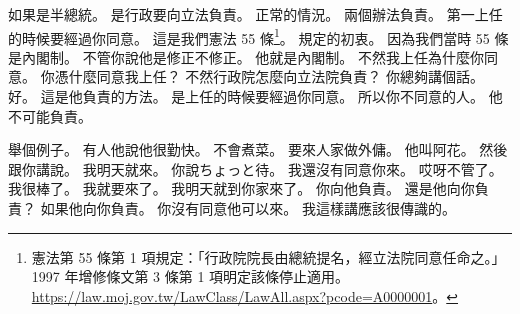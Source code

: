 \hypertarget{w01:cue:2482}{}如果是半總統。
\hypertarget{w01:cue:2483}{}是行政要向立法負責。
\hypertarget{w01:cue:2484}{}正常的情況。
\hypertarget{w01:cue:2485}{}兩個辦法負責。
\hypertarget{w01:cue:2486}{}第一上任的時候要經過你同意。
\hypertarget{w01:cue:2487}{}這是我們憲法 55 條\footnote{憲法第 55 條第 1 項規定：「行政院院長由總統提名，經立法院同意任命之。」1997 年增修條文第 3 條第 1 項明定該條停止適用。\url{https://law.moj.gov.tw/LawClass/LawAll.aspx?pcode=A0000001}。}。
\hypertarget{w01:cue:2488}{}規定的初衷。
\hypertarget{w01:cue:2489}{}因為我們當時 55 條是內閣制。
\hypertarget{w01:cue:2490}{}不管你說他是修正不修正。
\hypertarget{w01:cue:2491}{}他就是內閣制。
\hypertarget{w01:cue:2492}{}不然我上任為什麼你同意。
\hypertarget{w01:cue:2493}{}你憑什麼同意我上任？
\hypertarget{w01:cue:2494}{}不然行政院怎麼向立法院負責？
\hypertarget{w01:cue:2495}{}你總夠講個話。
\hypertarget{w01:cue:2496}{}好。
\hypertarget{w01:cue:2497}{}這是他負責的方法。
\hypertarget{w01:cue:2498}{}是上任的時候要經過你同意。
\hypertarget{w01:cue:2499}{}所以你不同意的人。
\hypertarget{w01:cue:2500}{}他不可能負責。

\hypertarget{w01:cue:2501}{}舉個例子。
\hypertarget{w01:cue:2502}{}有人他說他很勤快。
\hypertarget{w01:cue:2503}{}不會煮菜。
\hypertarget{w01:cue:2504}{}要來人家做外傭。
\hypertarget{w01:cue:2505}{}他叫阿花。
\hypertarget{w01:cue:2506}{}然後跟你講說。
\hypertarget{w01:cue:2507}{}我明天就來。
\hypertarget{w01:cue:2508}{}你說ちょっと待。
\hypertarget{w01:cue:2509}{}我還沒有同意你來。
\hypertarget{w01:cue:2510}{}哎呀不管了。
\hypertarget{w01:cue:2511}{}我很棒了。
\hypertarget{w01:cue:2512}{}我就要來了。
\hypertarget{w01:cue:2513}{}我明天就到你家來了。
\hypertarget{w01:cue:2514}{}你向他負責。
\hypertarget{w01:cue:2515}{}還是他向你負責？
\hypertarget{w01:cue:2516}{}如果他向你負責。
\hypertarget{w01:cue:2517}{}你沒有同意他可以來。
\hypertarget{w01:cue:2518}{}我這樣講應該很傳識的。


